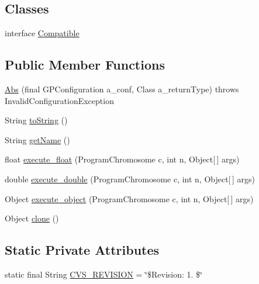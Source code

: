 \subsection*{Classes}
\begin{DoxyCompactItemize}
\item 
interface \hyperlink{interfaceorg_1_1jgap_1_1gp_1_1function_1_1_abs_1_1_compatible}{Compatible}
\end{DoxyCompactItemize}
\subsection*{Public Member Functions}
\begin{DoxyCompactItemize}
\item 
\hyperlink{classorg_1_1jgap_1_1gp_1_1function_1_1_abs_a68aebddb3343b8be3238ebd76cacd072}{Abs} (final G\-P\-Configuration a\-\_\-conf, Class a\-\_\-return\-Type)  throws Invalid\-Configuration\-Exception 
\item 
String \hyperlink{classorg_1_1jgap_1_1gp_1_1function_1_1_abs_a9419a3a7a3fe674ad35c3bbfa0bc9c7f}{to\-String} ()
\item 
String \hyperlink{classorg_1_1jgap_1_1gp_1_1function_1_1_abs_a12c0a9424bd3061439bbc89a5b45e9cf}{get\-Name} ()
\item 
float \hyperlink{classorg_1_1jgap_1_1gp_1_1function_1_1_abs_ac7274571667cef0c8875cdcce0fc3eed}{execute\-\_\-float} (Program\-Chromosome c, int n, Object\mbox{[}$\,$\mbox{]} args)
\item 
double \hyperlink{classorg_1_1jgap_1_1gp_1_1function_1_1_abs_a16c0cbe6fe8b7916b0c351c5c068af31}{execute\-\_\-double} (Program\-Chromosome c, int n, Object\mbox{[}$\,$\mbox{]} args)
\item 
Object \hyperlink{classorg_1_1jgap_1_1gp_1_1function_1_1_abs_a2e73ab52ded9043f33eb67920fd0f25c}{execute\-\_\-object} (Program\-Chromosome c, int n, Object\mbox{[}$\,$\mbox{]} args)
\item 
Object \hyperlink{classorg_1_1jgap_1_1gp_1_1function_1_1_abs_a32b7b4b41a89f23fcf860c5b64e27525}{clone} ()
\end{DoxyCompactItemize}
\subsection*{Static Private Attributes}
\begin{DoxyCompactItemize}
\item 
static final String \hyperlink{classorg_1_1jgap_1_1gp_1_1function_1_1_abs_a07dddbcd269d2b449bc66c484cc4a306}{C\-V\-S\-\_\-\-R\-E\-V\-I\-S\-I\-O\-N} = \char`\"{}\$Revision\-: 1. \$\char`\"{}
\end{DoxyCompactItemize}
